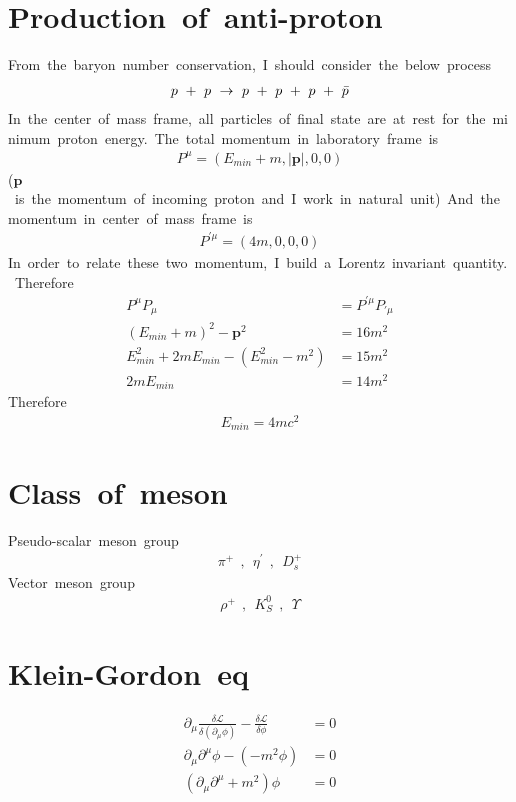 \section{Production\ of\ anti-proton}
From\ the\ baryon\ number\ conservation,\ I\ should\ consider\ the\ below\ process
\begin{align*}
    p\ +\ p\ \to\ p\ +\ p\ +\ p\ +\ \Bar{p}
\end{align*}
In\ the\ center\ of\ mass\ frame,\ all\ particles\ of\ final\ state\ are\ at\ rest\ for\ the\ minimum\ proton\ energy.\ The\ total\ momentum\ in\ laboratory\ frame\ is
\begin{align*}
    P^{\mu}=(E_{min}+m,|\bm{p}|,0,0)
\end{align*}
($\bm{p}$\ is\ the\ momentum\ of\ incoming\ proton\ and\ I\ work\ in\ natural\ unit)\ And\ the\ momentum\ in\ center\ of\ mass\ frame\ is
\begin{align*}
    P^{\prime\mu}=(4m,0,0,0)
\end{align*}
In\ order\ to\ relate\ these\ two\ momentum,\ I\ build\ a\ Lorentz\ invariant\ quantity.\ Therefore
\begin{align*}
    P^{\mu}P_{\mu}&=P^{\prime\mu}P_{\prime\mu}\\
    (E_{min}+m)^2-\bm{p}^2&=16m^2\\
    E_{min}^2+2mE_{min}-(E_{min}^2-m^2)&=15m^2\\
    2mE_{min}&=14m^2
\end{align*}
Therefore
\begin{align}
    E_{min}=4mc^2
\end{align}

\section{Class\ of\ meson}
Pseudo-scalar\ meson\ group
\begin{align}
    \pi^+\ \ ,\ \ \eta^{\prime}\ \ ,\ \ D_s^+
\end{align}
Vector\ meson\ group
\begin{align}
    \rho^+\ \ ,\ \ K_S^0\ \ ,\ \ \Upsilon
\end{align}

\section{Klein-Gordon\ eq}
\begin{align}
    \partial_{\mu}\frac{\delta\mathcal{L}}{\delta(\partial_{\mu}\phi)}-\frac{\delta\mathcal{L}}{\delta\phi}&=0\nonumber\\
    \partial_{\mu}\partial^{\mu}\phi-(-m^2\phi)&=0\nonumber\\
    (\partial_{\mu}\partial^{\mu}+m^2)\phi&=0
\end{align}

